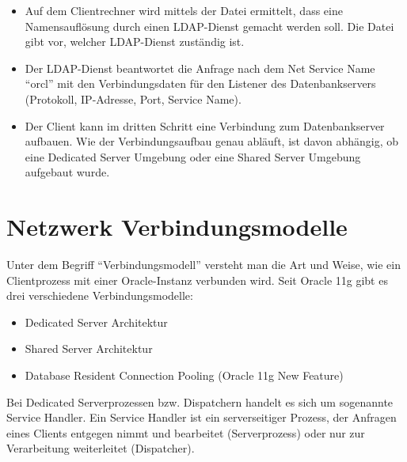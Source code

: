         \begin{itemize}
          \item Auf dem Clientrechner wird mittels der Datei  ermittelt, dass eine Namensauflösung durch einen LDAP-Dienst gemacht werden soll. Die Datei  gibt vor, welcher LDAP-Dienst zuständig ist.
          \item Der LDAP-Dienst beantwortet die Anfrage nach dem Net Service Name \enquote{orcl} mit den Verbindungsdaten für den Listener des Datenbankservers (Protokoll, IP-Adresse, Port, Service Name).
          \item Der Client kann im dritten Schritt eine Verbindung zum Datenbankserver aufbauen. Wie der Verbindungsaufbau genau abläuft, ist davon abhängig, ob eine Dedicated Server Umgebung oder eine Shared Server Umgebung aufgebaut wurde.
        \end{itemize}
    \section{Netzwerk Verbindungsmodelle}
    \label{connectionmodels}
      Unter dem Begriff \enquote{Verbindungsmodell} versteht man die Art und Weise, wie ein Clientprozess mit einer Oracle-Instanz verbunden wird. Seit Oracle 11g gibt es drei verschiedene Verbindungsmodelle:

      \begin{itemize}
        \item Dedicated Server Architektur
        \item Shared Server Architektur
        \item Database Resident Connection Pooling (Oracle 11g New Feature)
      \end{itemize}

      \begin{merke}
        Bei Dedicated Serverprozessen bzw. Dispatchern handelt es sich um sogenannte Service Handler. Ein Service Handler ist ein serverseitiger Prozess, der Anfragen eines Clients entgegen nimmt und bearbeitet (Serverprozess) oder nur zur Verarbeitung weiterleitet (Dispatcher).
      \end{merke}
